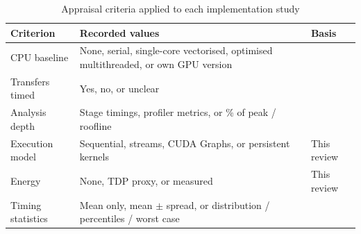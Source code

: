 \begin{table}[t]
  \caption{Appraisal criteria applied to each implementation study}
  \label{tab:rubric}
  \centering
  \footnotesize
  \renewcommand{\arraystretch}{1.15}
  \begin{tabularx}{\columnwidth}{@{}l>{\raggedright\arraybackslash}Xl@{}}
    \toprule
    \textbf{Criterion} & \textbf{Recorded values}                                       & \textbf{Basis} \\
    \midrule
    CPU baseline
                       & None, serial, single-core vectorised, optimised multithreaded,
    or own GPU version
                       & \cite{hoeflerScientificBenchmarkingParallel2015a,
    leeDebunking100XGPU2010b}                                                                            \\
    \addlinespace
    Transfers timed
                       & Yes, no, or unclear
                       & \cite{greggWhereDataWhy2011a}                                                   \\
    \addlinespace
    Analysis depth
                       & Stage timings, profiler metrics, or \% of peak / roofline
                       & \cite{hoeflerScientificBenchmarkingParallel2015a,
    williamsRooflineInsightfulVisual2009a}                                                               \\
    \addlinespace
    Execution model
                       & Sequential, streams, CUDA Graphs, or persistent kernels
                       & This review                                                                     \\
    \addlinespace
    Energy
                       & None, TDP proxy, or measured
                       & This review                                                                     \\
    \addlinespace
    Timing statistics
                       & Mean only, mean $\pm$ spread, or distribution / percentiles /
    worst case
                       & \cite{hoeflerScientificBenchmarkingParallel2015a}                               \\
    \bottomrule
  \end{tabularx}
\end{table}